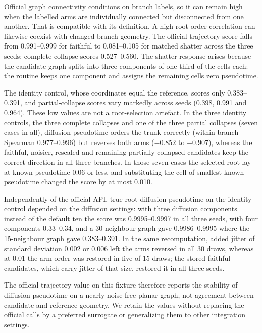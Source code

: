 \documentclass[11pt]{article}
\begin{document}
\FloatBarrier

Official graph connectivity conditions on branch labels, so it can remain high when the labelled arms are individually connected but disconnected from one another. That is compatible with its definition. A high root-order correlation can likewise coexist with changed branch geometry. The official trajectory score falls from 0.991--0.999 for faithful to 0.081--0.105 for matched shatter across the three seeds; complete collapse scores 0.527--0.560. The shatter response arises because the candidate graph splits into three components of one third of the cells each: the routine keeps one component and assigns the remaining cells zero pseudotime.

The identity control, whose coordinates equal the reference, scores only 0.383--0.391, and partial-collapse scores vary markedly across seeds (0.398, 0.991 and 0.964). These low values are not a root-selection artefact. In the three identity controls, the three complete collapses and one of the three partial collapses (seven cases in all), diffusion pseudotime orders the trunk correctly (within-branch Spearman 0.977--0.996) but reverses both arms ($-0.852$ to $-0.907$), whereas the faithful, noisier, rescaled and remaining partially collapsed candidates keep the correct direction in all three branches. In those seven cases the selected root lay at known pseudotime 0.06 or less, and substituting the cell of smallest known pseudotime changed the score by at most 0.010.

Independently of the official API, true-root diffusion pseudotime on the identity control depended on the diffusion settings: with three diffusion components instead of the default ten the score was 0.9995--0.9997 in all three seeds, with four components 0.33--0.34, and a 30-neighbour graph gave 0.9986--0.9995 where the 15-neighbour graph gave 0.383--0.391. In the same recomputation, added jitter of standard deviation 0.002 or 0.006 left the arms reversed in all 30 draws, whereas at 0.01 the arm order was restored in five of 15 draws; the stored faithful candidates, which carry jitter of that size, restored it in all three seeds.

The official trajectory value on this fixture therefore reports the stability of diffusion pseudotime on a nearly noise-free planar graph, not agreement between candidate and reference geometry. We retain the values without replacing the official calls by a preferred surrogate or generalizing them to other integration settings.
\end{document}
